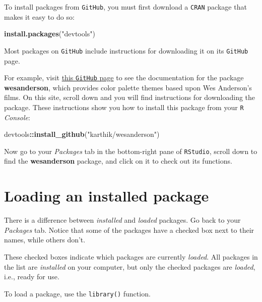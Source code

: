 \documentclass[
]{book}
\newenvironment{Shaded}{\begin{snugshade}}{\end{snugshade}}
\newcommand{\FunctionTok}[1]{\textcolor[rgb]{0.13,0.29,0.53}{\textbf{#1}}}
\newcommand{\NormalTok}[1]{#1}
\newcommand{\SpecialCharTok}[1]{\textcolor[rgb]{0.81,0.36,0.00}{\textbf{#1}}}
\newcommand{\StringTok}[1]{\textcolor[rgb]{0.31,0.60,0.02}{#1}}
\begin{document}
To install packages from \texttt{GitHub}, you must first download a \texttt{CRAN} package that makes it easy to do so:

\begin{Shaded}
\begin{Highlighting}[]
\FunctionTok{install.packages}\NormalTok{(}\StringTok{"devtools"}\NormalTok{)}
\end{Highlighting}
\end{Shaded}

Most packages on \texttt{GitHub} include instructions for downloading it on its \texttt{GitHub} page.

For example, visit \href{https://github.com/karthik/wesanderson}{this \texttt{GitHub} page} to see the documentation for the package \textbf{wesanderson}, which provides color palette themes based upon Wes Anderson's films. On this site, scroll down and you will find instructions for downloading the package. These instructions show you how to install this package from your \texttt{R} \emph{Console}:

\begin{Shaded}
\begin{Highlighting}[]
\NormalTok{devtools}\SpecialCharTok{::}\FunctionTok{install\_github}\NormalTok{(}\StringTok{"karthik/wesanderson"}\NormalTok{)}
\end{Highlighting}
\end{Shaded}

Now go to your \emph{Packages} tab in the bottom-right pane of \texttt{RStudio}, scroll down to find the \textbf{wesanderson} package, and click on it to check out its functions.

\section*{Loading an installed package}\label{loading-an-installed-package}

There is a difference between \emph{installed} and \emph{loaded} packages. Go back to your \emph{Packages} tab. Notice that some of the packages have a checked box next to their names, while others don't.

These checked boxes indicate which packages are currently \emph{loaded}. All packages in the list are \emph{installed} on your computer, but only the checked packages are \emph{loaded}, i.e., ready for use.

To load a package, use the \texttt{library()} function.
\end{document}
